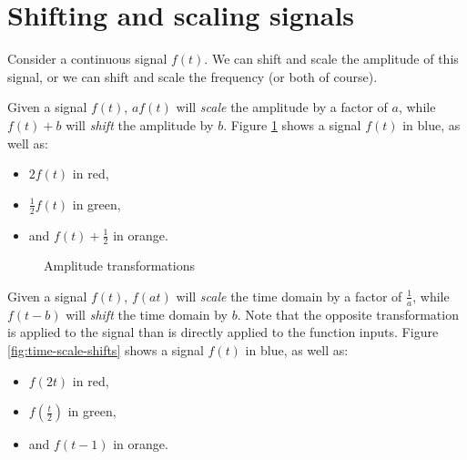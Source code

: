 \section{Shifting and scaling signals}

Consider a continuous signal $f(t)$. We can shift and scale the amplitude of this signal, or we can shift and scale the frequency (or both of course).

Given a signal $f(t)$, $af(t)$ will \emph{scale} the amplitude by a factor of $a$, while $f(t) + b$ will \emph{shift} the amplitude by $b$. Figure \ref{fig:amplitude-scale-shifts} shows a signal $f(t)$ in blue, as well as:
\begin{itemize}
    \item $2f(t)$ in red,
    \item $\frac{1}{2}f(t)$ in green,
    \item and $f(t) + \frac{1}{2}$ in orange.
\end{itemize}

\begin{figure}[ht!]
    \centering
\caption{Amplitude transformations}
\label{fig:amplitude-scale-shifts}
\end{figure}

Given a signal $f(t)$, $f(at)$ will \emph{scale} the time domain by a factor of $\frac{1}{a}$, while $f(t - b)$ will \emph{shift} the time domain by $b$. Note that the opposite transformation is applied to the signal than is directly applied to the function inputs. Figure \ref{fig:time-scale-shifts} shows a signal $f(t)$ in blue, as well as:
\begin{itemize}
    \item $f(2t)$ in red,
    \item $f(\frac{t}{2})$ in green,
    \item and $f(t - 1)$ in orange.
\end{itemize}

